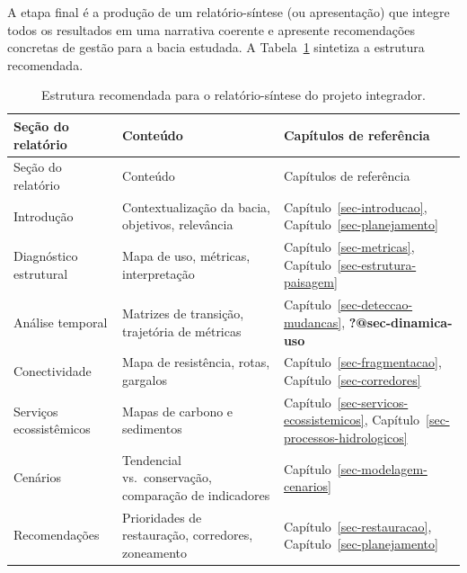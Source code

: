 \documentclass[
  portuguese,
  11pt,
  a4paper,
  open=any]{scrbook}
\begin{document}
A etapa final é a produção de um relatório-síntese (ou apresentação) que
integre todos os resultados em uma narrativa coerente e apresente
recomendações concretas de gestão para a bacia estudada. A
Tabela~\ref{tbl-relatorio} sintetiza a estrutura recomendada.

\begin{longtable}[]{@{}
  >{\raggedright\arraybackslash}p{}
  >{\raggedright\arraybackslash}p{}
  >{\raggedright\arraybackslash}p{}@{}}
\caption{Estrutura recomendada para o relatório-síntese do projeto
integrador.}\label{tbl-relatorio}\tabularnewline
\toprule\noalign{}
\begin{minipage}[b]{\linewidth}\raggedright
Seção do relatório
\end{minipage} & \begin{minipage}[b]{\linewidth}\raggedright
Conteúdo
\end{minipage} & \begin{minipage}[b]{\linewidth}\raggedright
Capítulos de referência
\end{minipage} \\
\midrule\noalign{}
\endfirsthead
\toprule\noalign{}
\begin{minipage}[b]{\linewidth}\raggedright
Seção do relatório
\end{minipage} & \begin{minipage}[b]{\linewidth}\raggedright
Conteúdo
\end{minipage} & \begin{minipage}[b]{\linewidth}\raggedright
Capítulos de referência
\end{minipage} \\
\midrule\noalign{}
\endhead
\bottomrule\noalign{}
\endlastfoot
Introdução & Contextualização da bacia, objetivos, relevância &
Capítulo~\ref{sec-introducao}, Capítulo~\ref{sec-planejamento} \\
Diagnóstico estrutural & Mapa de uso, métricas, interpretação &
Capítulo~\ref{sec-metricas}, Capítulo~\ref{sec-estrutura-paisagem} \\
Análise temporal & Matrizes de transição, trajetória de métricas &
Capítulo~\ref{sec-deteccao-mudancas}, \textbf{?@sec-dinamica-uso} \\
Conectividade & Mapa de resistência, rotas, gargalos &
Capítulo~\ref{sec-fragmentacao}, Capítulo~\ref{sec-corredores} \\
Serviços ecossistêmicos & Mapas de carbono e sedimentos &
Capítulo~\ref{sec-servicos-ecossistemicos},
Capítulo~\ref{sec-processos-hidrologicos} \\
Cenários & Tendencial vs.~conservação, comparação de indicadores &
Capítulo~\ref{sec-modelagem-cenarios} \\
Recomendações & Prioridades de restauração, corredores, zoneamento &
Capítulo~\ref{sec-restauracao}, Capítulo~\ref{sec-planejamento} \\
\end{longtable}
\end{document}
